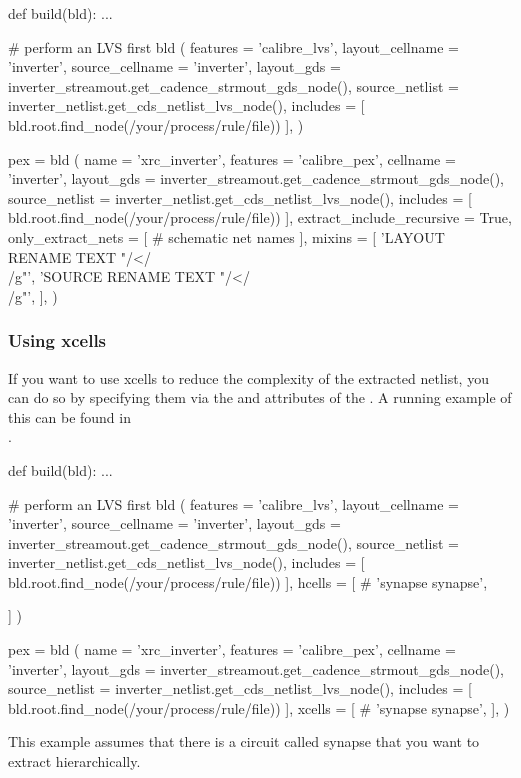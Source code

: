 \begin{lstwscript}
def build(bld):
    ...

    # perform an LVS first
    bld (
        features = 'calibre_lvs',
        layout_cellname = 'inverter',
        source_cellname = 'inverter',
        layout_gds = inverter_streamout.get_cadence_strmout_gds_node(),
        source_netlist = inverter_netlist.get_cds_netlist_lvs_node(),
        includes = [
            bld.root.find_node(/your/process/rule/file))
        ],
    )

    pex = bld (
        name = 'xrc_inverter',
        features = 'calibre_pex',
        cellname = 'inverter',
        layout_gds = inverter_streamout.get_cadence_strmout_gds_node(),
        source_netlist = inverter_netlist.get_cds_netlist_lvs_node(),
        includes = [
            bld.root.find_node(/your/process/rule/file))
        ],
        extract_include_recursive = True,
        only_extract_nets = [
            # schematic net names
        ],
        mixins = [
            'LAYOUT RENAME TEXT "/</\\[/g" "/>/\\]/g"',
            'SOURCE RENAME TEXT "/</\\[/g" "/>/\\]/g"',
        ],
    )
\end{lstwscript}
\subsubsection{Using xcells}
If you want to use xcells to reduce the complexity of the extracted netlist,
you can do so by specifying them via the  and  attributes
of the .
A running example of this can be found in\\
.

\begin{lstwscript}
def build(bld):
    ...

    # perform an LVS first
    bld (
        features = 'calibre_lvs',
        layout_cellname = 'inverter',
        source_cellname = 'inverter',
        layout_gds = inverter_streamout.get_cadence_strmout_gds_node(),
        source_netlist = inverter_netlist.get_cds_netlist_lvs_node(),
        includes = [
            bld.root.find_node(/your/process/rule/file))
        ],
        hcells = [
            #        'synapse synapse',

        ]
    )

    pex = bld (
        name = 'xrc_inverter',
        features = 'calibre_pex',
        cellname = 'inverter',
        layout_gds = inverter_streamout.get_cadence_strmout_gds_node(),
        source_netlist = inverter_netlist.get_cds_netlist_lvs_node(),
        includes = [
            bld.root.find_node(/your/process/rule/file))
        ],
        xcells = [
            #        'synapse synapse',
        ],
    )
\end{lstwscript}

This example assumes that there is a circuit called synapse that you want to
extract hierarchically.
